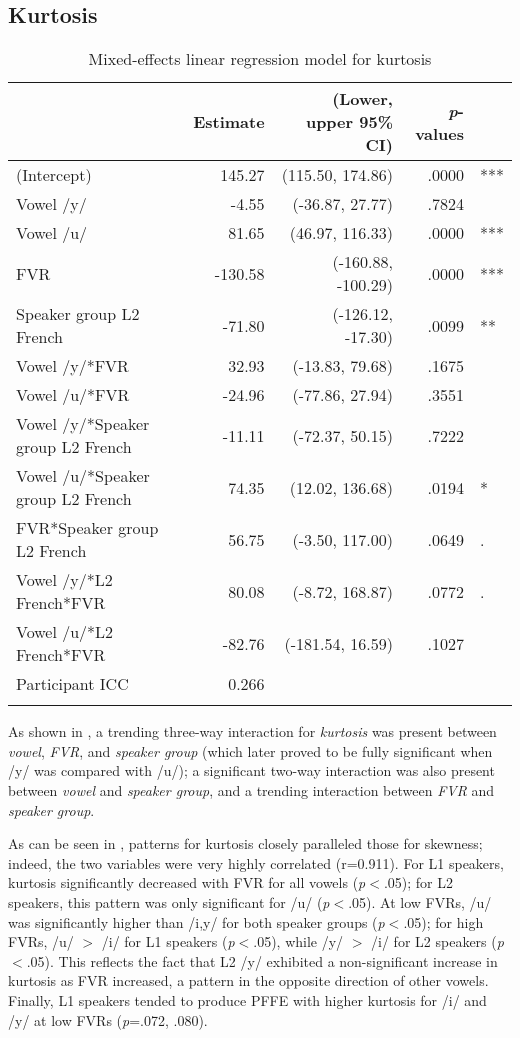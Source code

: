 \documentclass[output=paper,colorlinks,citecolor=brown,draftmode]{langscibook}
\begin{document}
\subsection{Kurtosis}
\begin{table}
\caption{Mixed-effects linear regression model for kurtosis}
\small
\begin{tabularx}{\textwidth}{Qrrrl}
 \lsptoprule
   & \textbf{Estimate} & \textbf{(Lower, upper 95\% CI)} & \textbf{\emph{p}-values} &  \\ [0.5ex]
 \midrule
 (Intercept) & 145.27 & (115.50, 174.86) & .0000 & ***\\
 Vowel /y/ & -4.55 & (-36.87, 27.77) & .7824 & \\
 Vowel /u/ & 81.65 & (46.97, 116.33) & .0000 & *** \\
 FVR & -130.58 & (-160.88, -100.29) & .0000 & *** \\
 Speaker group L2 French & -71.80 & (-126.12, -17.30) & .0099 & ** \\
 Vowel /y/*FVR & 32.93 & (-13.83, 79.68) & .1675 & \\
 Vowel /u/*FVR & -24.96 & (-77.86, 27.94) & .3551 & \\
 Vowel /y/*Speaker group L2 French & -11.11 & (-72.37, 50.15) & .7222 & \\
 Vowel /u/*Speaker group L2 French & 74.35 & (12.02, 136.68) & .0194 & * \\
 FVR*Speaker group L2 French & 56.75 & (-3.50, 117.00) & .0649 & . \\
 Vowel /y/*L2 French*FVR & 80.08 & (-8.72, 168.87) & .0772 & . \\
 Vowel /u/*L2 French*FVR & -82.76 & (-181.54, 16.59) & .1027 & \\
\midrule
 Participant ICC & 0.266 & \\
\lspbottomrule
\end{tabularx}
\label{table:5}
\end{table}

As shown in , a trending three-way interaction for \emph{kurtosis} was present between \emph{vowel}, \emph{FVR}, and \emph{speaker group} (which later proved to be fully significant when /y/ was compared with /u/); a significant two-way interaction was also present between \emph{vowel} and \emph{speaker group}, and a trending interaction between \emph{FVR} and \emph{speaker group}.


As can be seen in , patterns for kurtosis closely paralleled those for skewness; indeed, the two variables were very highly correlated (r=0.911). For L1 speakers, kurtosis significantly decreased with FVR for all vowels (\emph{p}$<$.05); for L2 speakers, this pattern was only significant for /u/ (\emph{p}$<$.05). At low FVRs, /u/ was significantly higher than /i,y/ for both speaker groups (\emph{p}$<$.05); for high FVRs, /u/ $>$ /i/ for L1 speakers (\emph{p}$<$.05), while /y/ $>$ /i/ for L2 speakers (\emph{p}$<$.05). This reflects the fact that L2 /y/ exhibited a non-significant increase in kurtosis as FVR increased, a pattern in the opposite direction of other vowels. Finally, L1 speakers tended to produce PFFE with higher kurtosis for /i/ and /y/ at low FVRs (\emph{p}=.072, .080).
\end{document}

